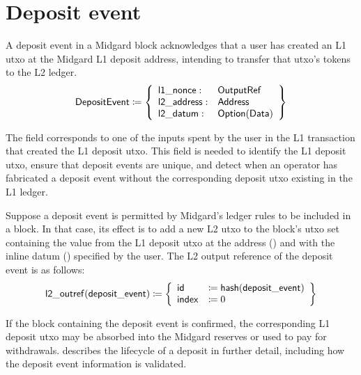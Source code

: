 \documentclass[../midgard.tex]{subfiles}
\begin{document}
\section{Deposit event}
\label{h:deposit-event}

A deposit event in a Midgard block acknowledges that a user has created an L1 utxo at the Midgard L1 deposit address, intending to transfer that utxo's tokens to the L2 ledger.
\begin{equation*}
    \mathsf{DepositEvent} \coloneq \left\{
    \begin{array}{ll}
        \mathsf{l1\_nonce} : & \mathsf{OutputRef} \\
        \mathsf{l2\_address} : & \mathsf{Address} \\
        \mathsf{l2\_datum} : & \mathsf{Option(Data)} \\
    \end{array} \right\}
\end{equation*}

The  field corresponds to one of the inputs spent by the user in the L1 transaction that created the L1 deposit utxo.
This field is needed to identify the L1 deposit utxo, ensure that deposit events are unique, and detect when an operator has fabricated a deposit event without the corresponding deposit utxo existing in the L1 ledger.

Suppose a deposit event is permitted by Midgard's ledger rules to be included in a block.
In that case, its effect is to add a new L2 utxo to the block's utxo set containing the value from the L1 deposit utxo at the address () and with the inline datum () specified by the user.
The L2 output reference of the deposit event is as follows: 
\begin{equation*}
    \mathsf{l2\_outref(deposit\_event)} \coloneq \left\{
    \begin{array}{ll}
        \mathsf{id} &\coloneq \mathsf{hash(deposit\_event)} \\
        \mathsf{index} &\coloneq 0
    \end{array} \right\}
\end{equation*}

If the block containing the deposit event is confirmed, the corresponding L1 deposit utxo may be absorbed into the Midgard reserves or used to pay for withdrawals.
 describes the lifecycle of a deposit in further detail, including how the deposit event information is validated.
\end{document}
